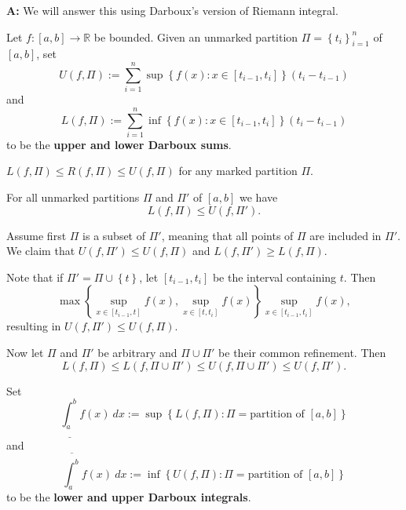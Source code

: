 \documentclass{notes}
\begin{document}
  {\boldmath \bfseries A:} We will answer this using Darboux's version of Riemann integral.
  
  \begin{defn}
    Let $f \colon [a, b] \to \mathbb R$ be bounded.
    Given an unmarked partition $\Pi = \left \{ t_i \right \}_{i = 1}^n$ of $[a, b]$, set 
    \[
      U(f, \Pi) := \sum_{i = 1}^n \sup \left \{ f(x) : x \in [t_{i - 1}, t_i] \right \} (t_i - t_{i - 1})
    \]
    and 
    \[
      L(f, \Pi) := \sum_{i = 1}^n \inf \left \{ f(x) : x \in [t_{i - 1}, t_i] \right \} (t_i - t_{i - 1})
    \]
    to be the {\boldmath \bfseries upper and lower Darboux sums}.
  \end{defn}
  
  \begin{note}
    $L(f, \Pi) \leq R(f, \Pi) \leq U(f, \Pi)$ for any marked partition $\Pi$.
  \end{note}
  
  \begin{lem}
    For all unmarked partitions $\Pi$ and $\Pi'$ of $[a, b]$ we have 
    \[
      L(f, \Pi) \leq U(f, \Pi').
    \]
  \end{lem}
  
  \begin{prf}
    Assume first $\Pi$ is a subset of $\Pi'$, meaning that all points of $\Pi$ are included in $\Pi'$.
    We claim that $U(f, \Pi') \leq U(f, \Pi)$ and $L(f, \Pi') \geq L(f, \Pi)$.
    
    Note that if $\Pi' = \Pi \cup \left \{ t \right \}$, let $[t_{i - 1}, t_i]$ be the interval containing $t$.
    Then 
    \[
      \max \left \{ \sup_{x \in [t_{i - 1}, t]} f(x), \sup_{x \in [t, t_i]} f(x) \right \} \sup_{x \in [t_{i - 1}, t_i]} f(x), 
    \]
    resulting in $U(f, \Pi') \leq U(f, \Pi)$.

    Now let $\Pi$ and $\Pi'$ be arbitrary and $\Pi \cup \Pi'$ be their common refinement.
    Then 
    \[
      L(f, \Pi) \leq L(f, \Pi \cup \Pi') \leq U(f, \Pi \cup \Pi') \leq U(f, \Pi').
    \]
  \end{prf}
  
  \begin{defn}
    Set 
    \[
      \underline{\int_a^b} f(x)\ dx := \sup \left \{ L(f, \Pi) : \Pi = \text{partition of $[a, b]$} \right \}
    \]
    and 
    \[
      \overline{\int_a^b} f(x)\ dx := \inf \left \{ U(f, \Pi) : \Pi = \text{partition of $[a, b]$} \right \}
    \]
    to be the {\boldmath \bfseries lower and upper Darboux integrals}.
  \end{defn}
  
\end{document}

